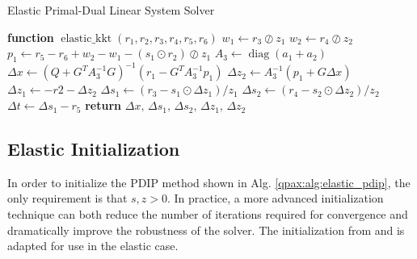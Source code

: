 %
%
\begin{algorithm} 
\begin{algorithmic}[1]
    \caption{Elastic Primal-Dual Linear System Solver}\label{qpax:alg:elastic_kkt}
        \State \textbf{function} $\operatorname{elastic\_kkt}(r_1, r_2, r_3, r_4, r_5, r_6)$ 
        \State $w_1 \gets r_3 \oslash z_1$
        \State $w_2 \gets r_4 \oslash z_2$
        \State $p_1 \gets r_5 - r_6 + w_2 - w_1 - (s_1 \odot r_2) \oslash z_1$
        \State $A_3 \gets \operatorname{diag}(a_1 + a_2)$
        \State $\Delta x \gets (Q + G^TA_3^{-1}G)^{-1}(r_1 - G^TA_3^{-1}p_1) $ 
        \State  $\Delta z_2 \gets A_3^{-1}(p_1 + G \Delta x) $ 
        \State  $\Delta z_1 \gets -r2 - \Delta z_2 $
        \State  $\Delta s_1 \gets (r_3 - s_1 \odot \Delta z_1) / z_1  $ 
        \State  $\Delta s_2 \gets (r_4 - s_2 \odot \Delta z_2) / z_2 $
        \State  $\Delta t \gets \Delta s_1 - r_5 $
    \State \textbf{return} $\Delta x,\, \Delta s_1,\, \Delta s_2,\, \Delta z_1,\, \Delta z_2$ 
\end{algorithmic}
\end{algorithm}
%
\subsection{Elastic Initialization}\label{qpax:sec:elastic_init}
In order to initialize the PDIP method shown in Alg. \eqref{qpax:alg:elastic_pdip}, the only requirement is that $s,z > 0$. In practice, a more advanced initialization technique can both reduce the number of iterations required for convergence and dramatically improve the robustness of the solver. The initialization from \cite{vandenberghe} and \cite{mattingley2012} is adapted for use in the elastic case. 


